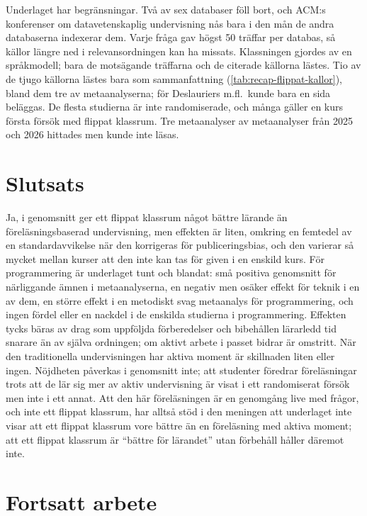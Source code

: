 Underlaget har begränsningar.  Två av sex databaser föll bort, och ACM:s
konferenser om datavetenskaplig undervisning nås bara i den mån de andra
databaserna indexerar dem.  Varje fråga gav högst 50 träffar per databas,
så källor längre ned i relevansordningen kan ha missats.  Klassningen
gjordes av en språkmodell; bara de motsägande träffarna och de citerade
källorna lästes.  Tio av de tjugo källorna lästes bara som sammanfattning
(\cref{tab:recap-flippat-kallor}), bland dem tre av metaanalyserna; för
Deslauriers m.fl.\ kunde bara en sida beläggas.  De flesta studierna är
inte randomiserade, och många gäller en kurs första försök med flippat
klassrum\autocite[12]{LagSaele2019}.  Tre metaanalyser av metaanalyser
från 2025 och 2026 hittades men kunde inte läsas.

\section{Slutsats}
\label{sec:recap-flippat-slutsats}

Ja, i genomsnitt ger ett flippat klassrum något bättre lärande än
föreläsningsbaserad undervisning, men effekten är liten, omkring en
femtedel av en standardavvikelse när den korrigeras för publiceringsbias,
och den varierar så mycket mellan kurser att den inte kan tas för given i
en enskild kurs.  För programmering är underlaget tunt och blandat: små
positiva genomsnitt för närliggande ämnen i metaanalyserna, en negativ
men osäker effekt för teknik i en av dem, en större effekt i en
metodiskt svag metaanalys för programmering, och ingen fördel eller en
nackdel i de enskilda studierna i programmering.  Effekten tycks bäras
av drag som uppföljda förberedelser och
bibehållen lärarledd tid snarare än av själva ordningen; om aktivt arbete
i passet bidrar är omstritt.  När den traditionella undervisningen har
aktiva moment är skillnaden liten eller ingen.  Nöjdheten påverkas i
genomsnitt inte; att studenter föredrar föreläsningar trots att de lär sig
mer av aktiv undervisning är visat i ett randomiserat försök men inte i
ett annat.  Att den här föreläsningen är en genomgång live med frågor, och
inte ett flippat klassrum, har alltså stöd i den meningen att underlaget
inte visar att ett flippat klassrum vore bättre än en föreläsning med
aktiva moment; att ett flippat klassrum är \enquote{bättre för
lärandet} utan förbehåll håller däremot inte.

\section{Fortsatt arbete}
\label{sec:recap-flippat-fortsatt}

